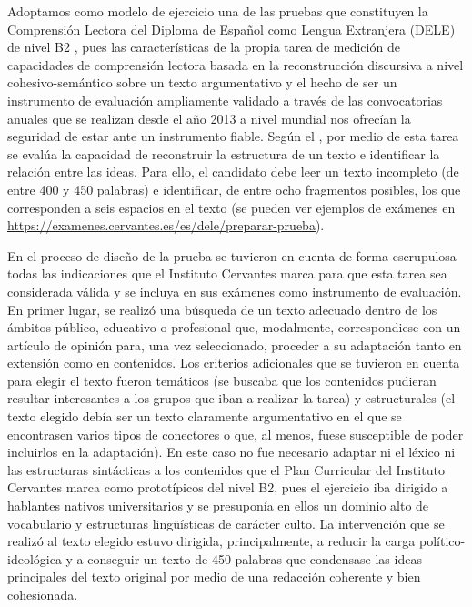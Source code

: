 \documentclass[spanish]{textolivre}
\begin{document}
Adoptamos como modelo de ejercicio una de las pruebas que constituyen la Comprensión Lectora del Diploma de Español como Lengua Extranjera (DELE) de nivel B2 \cite{instituto2014}, pues las características de la propia tarea de medición de capacidades de comprensión lectora basada en la reconstrucción discursiva a nivel cohesivo-semántico sobre un texto argumentativo y el hecho de ser un instrumento de evaluación ampliamente validado a través de las convocatorias anuales que se realizan desde el año 2013 a nivel mundial nos ofrecían la seguridad de estar ante un instrumento fiable. Según el \textcite{instituto2014}, por medio de esta tarea se evalúa la capacidad de reconstruir la estructura de un texto e identificar la relación entre las ideas. Para ello, el candidato debe leer un texto incompleto (de entre 400 y 450 palabras) e identificar, de entre ocho fragmentos posibles, los que corresponden a seis espacios en el texto (se pueden ver ejemplos de exámenes en \url{https://examenes.cervantes.es/es/dele/preparar-prueba}). 

En el proceso de diseño de la prueba se tuvieron en cuenta de forma escrupulosa todas las indicaciones que el Instituto Cervantes marca para que esta tarea sea considerada válida y se incluya en sus exámenes como instrumento de evaluación. En primer lugar, se realizó una búsqueda de un texto adecuado dentro de los ámbitos público, educativo o profesional que, modalmente, correspondiese con un artículo de opinión para, una vez seleccionado, proceder a su adaptación tanto en extensión como en contenidos. Los criterios adicionales que se tuvieron en cuenta para elegir el texto fueron temáticos (se buscaba que los contenidos pudieran resultar interesantes a los grupos que iban a realizar la tarea) y estructurales (el texto elegido debía ser un texto claramente argumentativo en el que se encontrasen varios tipos de conectores o que, al menos, fuese susceptible de poder incluirlos en la adaptación). En este caso no fue necesario adaptar ni el léxico ni las estructuras sintácticas a los contenidos que el Plan Curricular del Instituto Cervantes \cite{instituto2006} marca como prototípicos del nivel B2, pues el ejercicio iba dirigido a hablantes nativos universitarios y se presuponía en ellos un dominio alto de vocabulario y estructuras lingüísticas de carácter culto. La intervención que se realizó al texto elegido estuvo dirigida, principalmente, a reducir la carga político-ideológica y a conseguir un texto de 450 palabras que condensase las ideas principales del texto original por medio de una redacción coherente y bien cohesionada.
\end{document}
